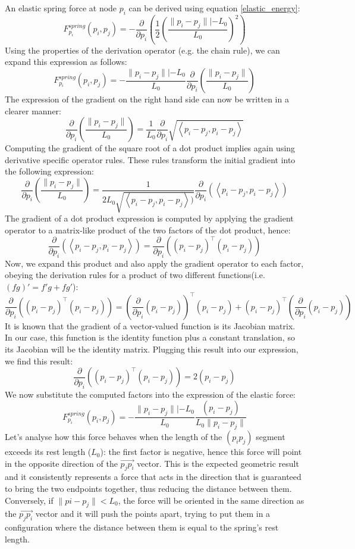 \documentclass[12pt]{article}
\begin{document}
An elastic spring force at node $p_i$ can be derived using equation \ref{elastic_energy}:
$$ F_{p_i}^{spring}(p_i, p_j) = -\frac{\partial}{\partial p_i} \left( \frac{1}{2} \left( \frac{\|p_i - p_j\|| - L_0}{L_0} \right)^ 2 \right) $$
Using the properties of the derivation operator (e.g. the chain rule), we can expand this expression as follows:
$$ F_{p_i}^{spring}(p_i,p_j) =  -\frac{\|p_i - p_j\|| - L_0}{L_0} \frac{\partial}{\partial p_i}\left( \frac{\|p_i - p_j\|}{L_0}\right)$$
The expression of the gradient on the right hand side can now be written in a clearer manner:
$$ \frac{\partial}{\partial p_i}\left( \frac{\|p_i - p_j\|}{L_0}\right) = \frac{1}{L_0}\frac{\partial}{\partial p_i}\sqrt{\left<p_i - p_j, p_i - p_j \right>}$$
Computing the gradient of the square root of a dot product implies again using derivative specific operator rules. These rules transform the initial gradient into the following expression:
$$  \frac{\partial}{\partial p_i}\left( \frac{\|p_i - p_j\|}{L_0}\right) = \frac{1}{2L_0\sqrt{\left<p_i - p_j, p_i - p_j \right>)}} \frac{\partial}{\partial p_i}\left(\left<p_i - p_j, p_i - p_j \right> \right) $$
The gradient of a dot product expression is computed by applying the gradient operator to a matrix-like product of the two factors of the dot product, hence:
$$  \frac{\partial}{\partial p_i}\left(\left<p_i - p_j, p_i - p_j \right> \right) = \frac{\partial }{\partial p_i} \left( (p_i - p_j)^\top (p_i - p_j) \right)$$
Now, we expand this product and also apply the gradient operator to each factor, obeying the derivation rules for a product of two different functions(i.e. $(fg)' = f'g + fg'$):
$$\frac{\partial }{\partial p_i} \left( (p_i - p_j)^\top (p_i - p_j) \right) = \left(\frac{\partial }{\partial p_i} (p_i - p_j)\right)^\top (p_i - p_j) + (p_i - p_j)^\top\left(\frac{\partial }{\partial p_i}(p_i - p_j)\right) $$
It is known that the gradient of a vector-valued function is its Jacobian matrix. In our case, this function is the identity function plus a constant translation, so its Jacobian will be the identity matrix. Plugging this result into our expression, we find this result:
$$ \frac{\partial }{\partial p_i} \left( (p_i - p_j)^\top (p_i - p_j) \right) = 2(p_i - p_j) $$
We now substitute the computed factors into the expression of the elastic force:
\begin{equation}
F_{p_i}^{spring}(p_i,p_j) =  -\frac{\|p_i - p_j\|| - L_0}{L_0} \frac{(p_i - p_j)}{L_0 \| p_i - p_j\|}
\end{equation}
Let's analyse how this force behaves when the length of the $(p_ip_j)$ segment exceeds its rest length ($L_0$): the first factor is negative, hence this force will point in the opposite direction of the $\overrightarrow{p_jp_i}$ vector. This is the expected geometric result and it consistently represents a force that acts in the direction that is guaranteed to bring the two endpoints together, thus reducing the distance between them. Conversely, if $\|pi - p_j\| < L_0$, the force will be oriented in the same direction as the $\overrightarrow{p_jp_i}$ vector and it will push the points apart, trying to put them in a configuration where the distance between them is equal to the spring's rest length. 
\end{document}
